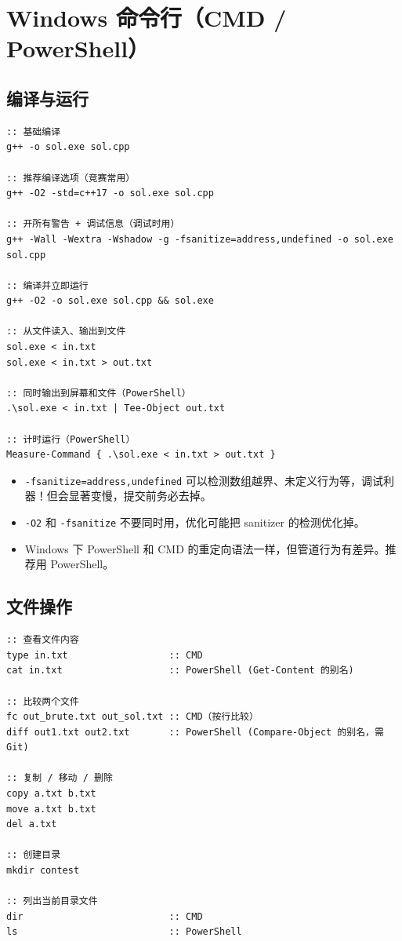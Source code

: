 \documentclass[UTF8,openany,oneside,zihao=-4]{ctexbook}
\begin{document}
\section{Windows 命令行（CMD / PowerShell）}

\subsection{编译与运行}

\begin{lstlisting}
:: 基础编译
g++ -o sol.exe sol.cpp

:: 推荐编译选项（竞赛常用）
g++ -O2 -std=c++17 -o sol.exe sol.cpp

:: 开所有警告 + 调试信息（调试时用）
g++ -Wall -Wextra -Wshadow -g -fsanitize=address,undefined -o sol.exe sol.cpp

:: 编译并立即运行
g++ -O2 -o sol.exe sol.cpp && sol.exe

:: 从文件读入、输出到文件
sol.exe < in.txt
sol.exe < in.txt > out.txt

:: 同时输出到屏幕和文件（PowerShell）
.\sol.exe < in.txt | Tee-Object out.txt

:: 计时运行（PowerShell）
Measure-Command { .\sol.exe < in.txt > out.txt }
\end{lstlisting}

\begin{warn}
\begin{itemize}
  \item \lstinline|-fsanitize=address,undefined| 可以检测数组越界、未定义行为等，调试利器！但会显著变慢，提交前务必去掉。
  \item \lstinline|-O2| 和 \lstinline|-fsanitize| 不要同时用，优化可能把 sanitizer 的检测优化掉。
  \item Windows 下 PowerShell 和 CMD 的重定向语法一样，但管道行为有差异。推荐用 PowerShell。
\end{itemize}
\end{warn}

\subsection{文件操作}

\begin{lstlisting}
:: 查看文件内容
type in.txt                  :: CMD
cat in.txt                   :: PowerShell (Get-Content 的别名)

:: 比较两个文件
fc out_brute.txt out_sol.txt :: CMD（按行比较）
diff out1.txt out2.txt       :: PowerShell (Compare-Object 的别名，需 Git)

:: 复制 / 移动 / 删除
copy a.txt b.txt
move a.txt b.txt
del a.txt

:: 创建目录
mkdir contest

:: 列出当前目录文件
dir                          :: CMD
ls                           :: PowerShell
\end{lstlisting}
\end{document}
